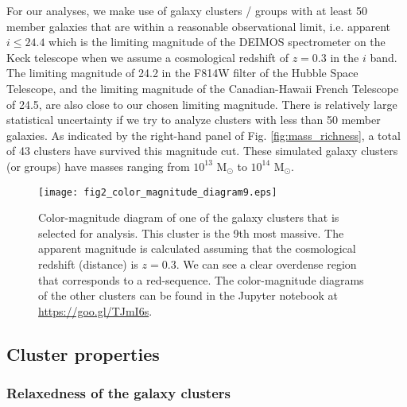 For our analyses, we make use of galaxy clusters / groups 
with at least 50 member galaxies that are within a reasonable observational limit, 
i.e. apparent $i \leq 24.4$ which is the limiting magnitude of the DEIMOS
spectrometer on the Keck telescope when we assume a cosmological redshift of $z = 0.3$
in the $i$ band. The limiting magnitude of 24.2 in the
F814W filter of the Hubble Space Telescope, and the limiting magnitude of the
Canadian-Hawaii French Telescope of 24.5, 
are also close to our chosen limiting magnitude. 
There is relatively large statistical uncertainty if we try
to analyze clusters with less than 50 member galaxies. 
As indicated by the right-hand panel of Fig. \ref{fig:mass_richness}, 
a total of 43 clusters have 
survived this magnitude cut. These simulated galaxy clusters (or groups) have 
masses ranging from $10^{13}$ M$_\odot $ to $10^{14}$ M$_\odot$.  

\begin{figure}
	\centering
	\texttt{[image: fig2\_color\_magnitude\_diagram9.eps]}
	\caption{Color-magnitude diagram of one of the galaxy clusters that is selected for 
		analysis. This cluster is the 9th most massive. 
		The apparent magnitude is calculated assuming that 
		the cosmological redshift (distance) is $z = 0.3$. 
		We can see a clear overdense region that corresponds to a red-sequence.
		The color-magnitude diagrams of the other clusters can be found in the
		Jupyter notebook at \href{https://github.com/karenyyng/galaxy_DM_offset/blob/master/code/analyses/fig2_color_magnitude_diagram.ipynb}{https://goo.gl/TJmI6s}.
		\label{fig:color_magnitude_diagram}
	} 
\end{figure}

\subsection{Cluster properties}
\label{subsec:cluster_properties}

\subsubsection{Relaxedness of the galaxy clusters}
\label{subsubsec:relaxedness}

